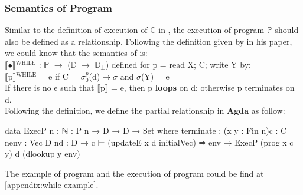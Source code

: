 \subsubsection{Semantics of Program}
Similar to the definition of execution of $\mathds{C}$ in \WHILE, the execution of program $\mathds{P}$ should also be defined as a relationship.
Following the definition given by  in his paper\cite{jones_computability_1997}, we could know that the semantics of \WHILE is:\\
$\llbracket$$\bullet$$\rrbracket$$^{\mbox{WHILE}}$ : $\mathds{P}$ $\rightarrow$ ($\mathds{D}$ $\rightarrow$ $\mathds{D}$$_\perp$) defined for p = read X; C; write Y by:\\
$\llbracket$p$\rrbracket$$^{\mbox{WHILE}}$ = e if C $\vdash \sigma^p_0$(d)$ \rightarrow \sigma$ and $\sigma$(Y) = e\\
If there is no e such that $\llbracket$p$\rrbracket$ = e, then p \textbf{loops} on d; otherwise p terminates on d.\\
Following the definition, we define the partial relationship in \textbf{Agda} as follow:
\begin{code}
data ExecP {n : ℕ} : P n → D → D → Set where
  terminate : (x y : Fin n){c : C n}{env : Vec D n}{d : D}
            → c ⊢ (updateE x d initialVec) ⇒ env
            → ExecP (prog x c y) d (dlookup y env)
\end{code}
The example of \WHILE program and the execution of \WHILE program could be find at \ref{appendix:while example}.
